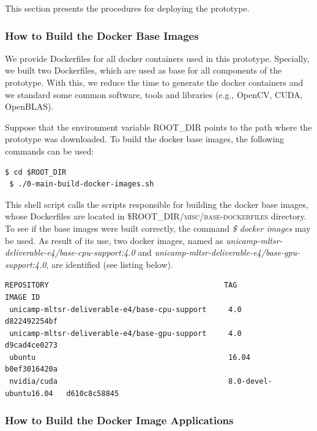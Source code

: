 This section presents the procedures for deploying the prototype.

\subsubsection{How to Build the Docker Base Images}
\label{sec:build-docker-base-images}

We provide Dockerfiles for all docker containers used in this prototype. Specially, we built two Dockerfiles, which are used as base for all components of the prototype. With this, we reduce the time to generate the docker containers and we standard some common software, tools and libraries (e.g., OpenCV, CUDA, OpenBLAS).

Suppose that the environment variable \textsc{ROOT\_DIR} points to the path where the prototype was downloaded. To build the docker base images, the following commands can be used:
%
\begin{lstlisting}[style=fancyterminal]
 $ cd $ROOT_DIR
 $ ./0-main-build-docker-images.sh
\end{lstlisting}

This shell script calls the scripts responsible for building the docker base images, whose Dockerfiles are located in \textsc{\$ROOT\_DIR/misc/base-dockerfiles} directory. To see if the base images were built correctly, the command \emph{\$ docker images} may be used. As result of its use, two docker images, named as \textit{unicamp-mltsr-deliverable-e4/base-cpu-support:4.0} and \textit{unicamp-mltsr-deliverable-e4/base-gpu-support:4.0}, are identified (see listing below).

\begin{lstlisting}[style=fancyterminal]
 REPOSITORY                                        TAG                     IMAGE ID    
 unicamp-mltsr-deliverable-e4/base-cpu-support     4.0                     d822492254bf
 unicamp-mltsr-deliverable-e4/base-gpu-support     4.0                     d9cad4ce0273
 ubuntu                                            16.04                   b0ef3016420a
 nvidia/cuda                                       8.0-devel-ubuntu16.04   d610c8c58845
\end{lstlisting}



\subsubsection{How to Build the Docker Image Applications}
\label{sec:build-docker-image-app}

